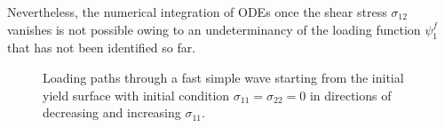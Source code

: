 Nevertheless, the numerical integration of ODEs once the shear stress $\sigma_{12}$ vanishes is not possible owing to an undeterminancy of the loading function $\psi_1^f$ that has not been identified so far.
\begin{figure}[h!]
  \centering
  \caption{Loading paths through a fast simple wave starting from the initial yield surface with initial condition $\sigma_{11}=\sigma_{22}=0$ in directions of decreasing and increasing $\sigma_{11}$.}
  \label{fig:fast_path_plane_stress}
\end{figure}

